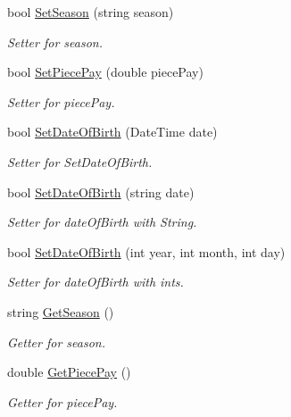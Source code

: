 \begin{DoxyCompactItemize}
bool \hyperlink{class_all_employees_1_1_seasonal_employee_a3cefc2899365780dd013b990ef46326c}{Set\+Season} (string season)
\begin{DoxyCompactList}\small\item\em Setter for season. \end{DoxyCompactList}\item 
bool \hyperlink{class_all_employees_1_1_seasonal_employee_ad28298b79565cec8f11ee686bc52fbe7}{Set\+Piece\+Pay} (double piece\+Pay)
\begin{DoxyCompactList}\small\item\em Setter for piece\+Pay. \end{DoxyCompactList}\item 
bool \hyperlink{class_all_employees_1_1_seasonal_employee_ae9579944f7e43d9504d0d64159b79be2}{Set\+Date\+Of\+Birth} (Date\+Time date)
\begin{DoxyCompactList}\small\item\em Setter for Set\+Date\+Of\+Birth. \end{DoxyCompactList}\item 
bool \hyperlink{class_all_employees_1_1_seasonal_employee_a86bfe17c0e2229d2308c3f25773acf2e}{Set\+Date\+Of\+Birth} (string date)
\begin{DoxyCompactList}\small\item\em Setter for date\+Of\+Birth with String. \end{DoxyCompactList}\item 
bool \hyperlink{class_all_employees_1_1_seasonal_employee_a01ae315610e9d0259906622bdb268cbc}{Set\+Date\+Of\+Birth} (int year, int month, int day)
\begin{DoxyCompactList}\small\item\em Setter for date\+Of\+Birth with ints. \end{DoxyCompactList}\item 
string \hyperlink{class_all_employees_1_1_seasonal_employee_a189a882ddc11648f3df82e5c0acd5522}{Get\+Season} ()
\begin{DoxyCompactList}\small\item\em Getter for season. \end{DoxyCompactList}\item 
double \hyperlink{class_all_employees_1_1_seasonal_employee_aac2d6f048d03257ccc96481b1550be0b}{Get\+Piece\+Pay} ()
\begin{DoxyCompactList}\small\item\em Getter for piece\+Pay. \end{DoxyCompactList}\end{DoxyCompactItemize}
